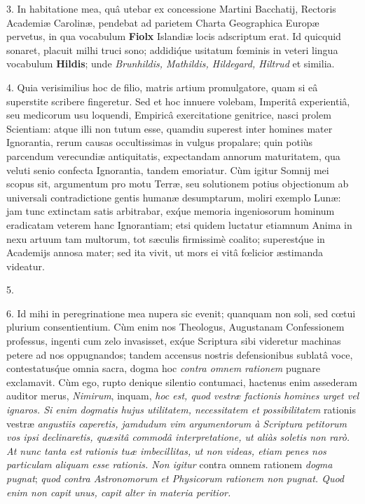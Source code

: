 \documentclass[a4paper, 11pt, oneside, polutonikogreek, german]{article}
\begin{document}
3. In habitatione mea, quâ utebar ex concessione Martini Bacchatij, Rectoris Academiæ Carolinæ, pendebat ad parietem Charta Geographica Europæ pervetus, in qua vocabulum \textbf{Fiolx} Islandiæ locis adscriptum erat. Id quicquid sonaret, placuit milhi truci sono; addidi\'que usitatum fœminis in veteri lingua vocabulum \textbf{Hildis}; unde \emph{Brunhildis, Mathildis, Hildegard, Hiltrud} et similia.

4. Quia verisimilius hoc de filio, matris artium promulgatore, quam si eâ superstite scribere fingeretur. Sed et hoc innuere volebam, Imperitâ experientiâ, seu medicorum usu loquendi, Empiricâ exercitatione genitrice, nasci prolem Scientiam: atque illi non tutum esse, quamdiu superest inter homines mater Ignorantia, rerum causas occultissimas in vulgus propalare; quin potiùs parcendum verecundiæ antiquitatis, expectandam annorum maturitatem, qua veluti senio confecta Ignorantia, tandem emoriatur. Cùm igitur Somnij mei scopus sit, argumentum pro motu Terræ, seu solutionem potius objectionum ab universali contradictione gentis humanæ desumptarum, moliri exemplo Lunæ: jam tunc extinctam satis arbitrabar, ex\'que memoria ingeniosorum hominum eradicatam veterem hanc Ignorantiam; etsi quidem luctatur etiamnum Anima in nexu artuum tam multorum, tot sæculis firmissimè coalito; superest\'que in Academijs annosa mater; sed ita vivit, ut mors ei vitâ fœlicior æstimanda videatur.

5.

6. Id mihi in peregrinatione mea nupera sic evenit; quanquam non soli, sed cœtui plurium consentientium. Cùm enim nos Theologus, Augustanam Confessionem professus, ingenti cum zelo invasisset, ex\'que Scriptura sibi videretur machinas petere ad nos oppugnandos; tandem accensus nostris defensionibus sublatâ voce, contestatus\'que omnia sacra, dogma hoc \emph{contra omnem rationem} pugnare exclamavit. Cùm ego, rupto denique silentio contumaci, hactenus enim assederam auditor merus, \emph{Nimirum}, inquam, \emph{hoc est, quod vestræ factionis homines urget vel ignaros. Si enim dogmatis hujus utilitatem, necessitatem et possibilitatem} rationis vestræ \emph{angustiis caperetis, jamdudum vim argumentorum à Scriptura petitorum vos ipsi declinaretis, quæsitâ commodâ interpretatione, ut aliàs soletis non rarò. At nunc tanta est rationis tuæ imbecillitas, ut non videas, etiam penes nos particulam aliquam esse rationis. Non igitur} contra omnem rationem \emph{dogma pugnat}; \emph{quod contra Astronomorum et Physicorum rationem non pugnat. Quod enim non capit unus, capit alter in materia peritior.}
\end{document}
